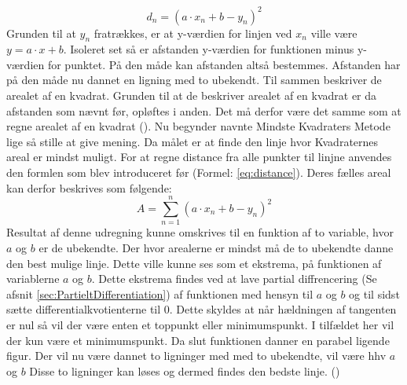 \begin{equation}\label{eq:distance}
    d_n = (a \cdot x_n + b - y_n)^2 
\end{equation} Grunden til at $y_n$ fratrækkes, er at y-værdien for linjen ved $x_n$ ville være $y = a \cdot x + b$. Isoleret set så er afstanden y-værdien for funktionen minus y-værdien for punktet. På den måde kan afstanden altså bestemmes. Afstanden har på den måde nu dannet en ligning med to ubekendt. Til sammen beskriver de arealet af en kvadrat. Grunden til at de beskriver arealet af en kvadrat er da afstanden som nævnt før, opløftes i anden. Det må derfor være det samme som at regne arealet af en kvadrat (\cite{Bentzen2014}). Nu begynder navnte Mindste Kvadraters Metode lige så stille at give mening. Da målet er at finde den linje hvor Kvadraternes areal er mindst muligt. For at regne distance fra alle punkter til linjne anvendes den formlen som blev introduceret før (Formel: \ref{eq:distance}). Deres fælles areal kan derfor beskrives som følgende:
\begin{equation}\label{eq:formularForDistanceForAllDataPoints}A = \sum_{n=1}^n (a \cdot x_n + b - y_n)^2\end{equation}
Resultat af denne udregning kunne omskrives til en funktion af to variable, hvor $a$ og $b$ er de ubekendte. Der hvor arealerne er mindst må de to ubekendte danne den best mulige linje. Dette ville kunne ses som et ekstrema, på funktionen af variablerne $a$ og $b$. Dette ekstrema findes ved at lave partial diffrencering (Se afsnit \ref{sec:PartieltDifferentiation}) af funktionen med hensyn til $a$ og $b$ og til sidst sætte differentialkvotienterne til 0. Dette skyldes at når hældningen af tangenten er nul så vil der være enten et toppunkt eller minimumspunkt. I tilfældet her vil der kun være et minimumspunkt. Da slut funktionen danner en parabel ligende figur. Der vil nu være dannet to ligninger med med to ubekendte, vil være hhv $a$ og $b$ Disse to ligninger kan løses og dermed findes den bedste linje. (\cite{webmatematikMindsteKvadratersMetode})


